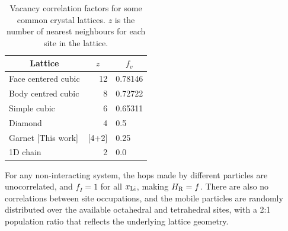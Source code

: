 \documentclass[aps,prb,twocolumn,superscriptaddress,reprint]{revtex4-1}
\newcommand{\xLi}{x_\m{Li}}
\begin{document}
\begin{table}[htb]
   \begin{center}
     \begin{tabular}{lrl} \hline
        \multicolumn{1}{c}{Lattice} & \multicolumn{1}{c}{$z$} & \multicolumn{1}{c}{$f_v$} \\ \hline
        Face centered cubic\cite{CompaanAndHaven_TransFaradaySoc1956} & 12 & 0.78146 \\
        Body centred cubic\cite{CompaanAndHaven_TransFaradaySoc1956} & 8 & 0.72722 \\
        Simple cubic\cite{CompaanAndHaven_TransFaradaySoc1956} & 6 & 0.65311 \\
        Diamond\cite{CompaanAndHaven_TransFaradaySoc1956} & 4 & 0.5 \\
        Garnet [This work] & [4+2] & 0.25 \\ 
        1D chain\cite{Mehrer_DiffusionBook} & 2 & 0.0 \\ \hline
     \end{tabular}
   \caption{\label{tab:vacancy_correlation_factors}Vacancy correlation factors for some common crystal lattices. $z$ is the number of nearest neighbours for each site in the lattice.}
   \end{center}
 \end{table}

For any non-interacting system, the hops made by different particles are unocorrelated, and $f_I=1$ for all $\xLi$, making $H_{\mathrm{R}}=f$. 
There are also no correlations between site occupations, and the mobile particles are randomly distributed over the available octahedral and tetrahedral sites, with a 2:1 population ratio that reflects the underlying lattice geometry.
\end{document}

